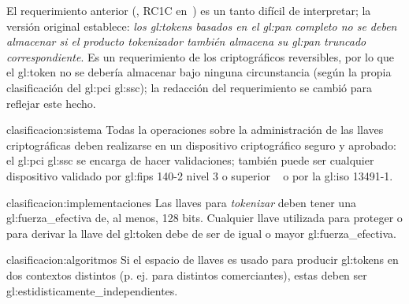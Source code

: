 El requerimiento anterior (,
RC1C en~\cite{pci_tokens}) es un tanto difícil de interpretar; la versión
original establece: \textit{los \glspl{gl:token} basados en el \gls{gl:pan}
completo no se deben almacenar si el producto tokenizador también almacena
su \gls{gl:pan} truncado correspondiente}. Es un requerimiento de los
criptográficos reversibles, por lo que el \gls{gl:token} no se debería
almacenar bajo ninguna circunstancia (según la propia clasificación del
\gls{gl:pci} \gls{gl:ssc}); la redacción del requerimiento se cambió para
reflejar este hecho.

{clasificacion:sistema}
{
  Todas la operaciones sobre la administración de las llaves criptográficas
  deben realizarse en un dispositivo criptográfico seguro y aprobado: el
  \gls{gl:pci} \gls{gl:ssc} se encarga de hacer validaciones; también puede ser
  cualquier dispositivo validado por \gls{gl:fips} 140-2 nivel 3 o superior
 ~\cite{nist_modulos_criptograficos} o por la \gls{gl:iso} 13491-1.
}

{clasificacion:implementaciones}
{
  Las llaves para \textit{tokenizar} deben tener una
  \gls{gl:fuerza_efectiva} de, al menos, 128 bits. Cualquier llave utilizada
  para proteger o para derivar la llave del \gls{gl:token} debe de ser de igual
  o mayor \gls{gl:fuerza_efectiva}.
}

{clasificacion:algoritmos}
{
  Si el espacio de llaves es usado para producir \glspl{gl:token} en dos
  contextos distintos (p. ej. para distintos comerciantes), estas deben ser
  \glspl{gl:estidisticamente_independiente}.
}
